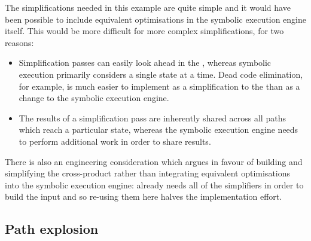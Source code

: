 The simplifications needed in this example are quite simple and it
would have been possible to include equivalent optimisations in the
symbolic execution engine itself.  This would be more difficult for
more complex simplifications, for two reasons:
\begin{itemize}
\item Simplification passes can easily look ahead in the
  {\StateMachine}, whereas symbolic execution primarily considers a
  single state at a time.  Dead code elimination, for example, is much
  easier to implement as a simplification to the {\StateMachine} than
  as a change to the symbolic execution engine.
\item The results of a simplification pass are inherently shared
  across all paths which reach a particular state, whereas the
  symbolic execution engine needs to perform additional work in order
  to share results.
\end{itemize}
There is also an engineering consideration which argues in favour of
building and simplifying the cross-product {\StateMachine} rather than
integrating equivalent optimisations into the symbolic execution
engine: {\implementation} already needs all of the simplifiers in
order to build the input {\StateMachines} and so re-using them here
halves the implementation effort.


\subsection{Path explosion}

